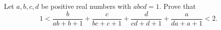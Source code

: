 Let $a,b,c,d$ be positive real numbers with $abcd=1$. Prove that
\[1<\dfrac{b}{ab+b+1}+\dfrac{c}{bc+c+1}+\dfrac{d}{cd+d+1}+\dfrac{a}{da+a+1}<2 .\]
